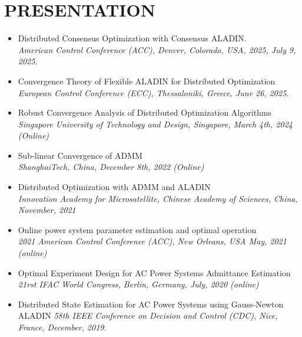 \documentclass[paper=a4,fontsize=11pt]{scrartcl} %
\newcommand{\NewPart}[1]{\section*{\uppercase{#1}}}
\begin{document}
\NewPart{PRESENTATION}{}
\begin{itemize}

\item  {
	{ Distributed Consensus Optimization with Consensus ALADIN.}\\
	\emph{American Control Conference (ACC), Denver, Colorado, USA, 2025, July 9, 2025.
} }

	
		\item  {
		{ Convergence Theory of Flexible ALADIN for Distributed Optimization}\\
		\emph{European Control Conference (ECC), Thessaloniki, Greece, June 26, 2025.
	} }
		\item  {
		{Robust Convergence Analysis of Distributed Optimization Algorithms}\\
		\emph{Singapore University of Technology and Design, Singapore, March 4th, 2024 (Online)
	} }
	
		\item  {
		{Sub-linear Convergence of ADMM}\\
		\emph{ShanghaiTech, China, December 8th, 2022 (Online)
	} }
	
	\item  {
		{Distributed Optimization with ADMM and ALADIN}\\
		\emph{Innovation Academy for Microsatellite, Chinese Academy of Sciences, China,
			November, 2021
	} }
	
	\item  {
		{Online power system parameter estimation and optimal operation}\\
		\emph{2021 American Control Conference (ACC), New Orleans, USA May, 2021 (online)
	} }
	
	\item  {
		Optimal Experiment Design for AC Power Systems Admittance Estimation\\
		\emph{21rst IFAC World Congress, Berlin, Germany, July, 2020 (online)
	} }
	
	\item  {
		Distributed State Estimation for AC Power Systems using Gauss-Newton ALADIN 
		\emph{58th IEEE Conference on Decision and Control (CDC),
			Nice, France, December, 2019.} }
\end{itemize}
\end{document}
